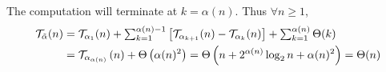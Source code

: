 The computation will terminate at $k = \alpha(n)$. Thus $\forall n\ge 1$,
\begin{equation} \label{eq: inv-ack-runtime-improved}
\begin{aligned}
\mathcal{T}_{\tilde{\alpha}}(n)
& = \textstyle \mathcal{T}_{\alpha_1}(n) + \sum_{k=1}^{\alpha(n) - 1}
\left[ \mathcal{T}_{\alpha_{k+1}}(n) - \mathcal{T}_{\alpha_k}(n)
\right] + \sum_{k=1}^{\alpha(n)}\Theta(k) \\
& = \mathcal{T}_{\alpha_{\alpha(n)}}\left(n\right) + \Theta\left(\alpha(n)^2\right)
= \Theta\left(n + 2^{\alpha(n)}\log_2n + \alpha(n)^2\right) = \Theta(n)
\end{aligned}
\end{equation}